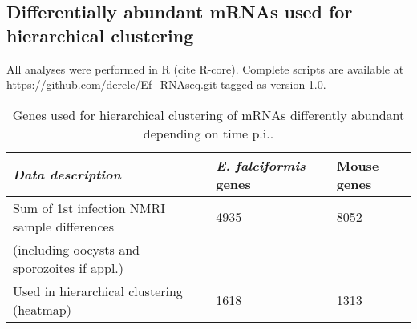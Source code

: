 \documentclass{bmcart}
\begin{document}



\subsection{Differentially abundant mRNAs used for hierarchical clustering}
All analyses were performed in R (cite R-core). Complete scripts are
available at https://github.com/derele/Ef\_RNAseq.git tagged as version
1.0.

\setlength{\tabcolsep}{10pt}
\begin{table}[H]
\small
\begin{center}
\caption{Genes used for hierarchical clustering of mRNAs differently abundant depending on time p.i..}
\begin{tabular}{*3l}    \toprule
	\textit{Data description} & \emph{E. falciformis} genes & Mouse genes	\\ \midrule
	Sum of 1st infection NMRI sample differences	& 4935 & 8052 \\ 
	(including oocysts and sporozoites if appl.)	\\	
	Used in hierarchical clustering (heatmap)  	& 1618 & 1313 \\ 	\bottomrule	
\hline
\end{tabular}
\end{center}
\end{table}



\end{document}
